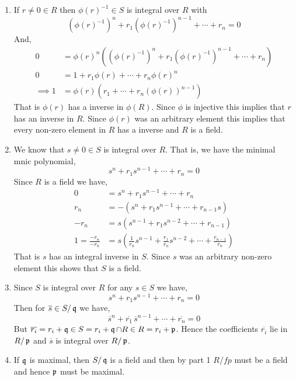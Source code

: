 \documentclass[Notebook.tex]{subfiles}
\begin{document}
\begin{solution}
    \bbni
    \begin{enumerate}
        \item If $r \neq 0 \in R$ then $\phi(r)^{-1} \in S$ is integral over $R$ with 
        \[(\phi(r)^{-1})^n + r_1(\phi(r)^{-1})^{n-1} + \cdots + r_n = 0\]
        And, 
        \begin{align*}
           0 &= \phi(r)^n\left((\phi(r)^{-1})^n + r_1(\phi(r)^{-1})^{n-1} + \cdots + r_n\right) \\
           0 &= 1 + r_1\phi(r) + \cdots + r_n\phi(r)^n  \\
           \implies 1 &= \phi(r)(r_1 + \cdots + r_n(\phi(r))^{n-1})
        \end{align*}
        That is $\phi(r)$ has a inverse in $\phi(R)$. Since $\phi$ is injective this implies that $r$ has an inverse in $R$. Since $\phi(r)$ was an arbitrary element this implies that every non-zero element in $R$ has a inverse and $R$ is a field. 

        \item We know that $s \neq 0 \in S$ is integral over $R$. That is, we have the minimal mnic polynomial, 
        \[s^n + r_1s^{n-1} + \cdots + r_n = 0\]
        Since $R$ is a field we have, 
        \begin{align*}
            0 &= s^n + r_1s^{n-1} + \cdots + r_n  \\ 
            r_n &= - (s^n + r_1s^{n-1} + \cdots + r_{n-1}s) \\ 
            -r_n &= s(s^{n-1} + r_1s^{n-2} + \cdots + r_{n-1}) \\ 
            1 = \frac{-r_n}{-r_n} &= s \left (\frac{1}{r_n}s^{n-1} + \frac{r_1}{r_n}s^{n-2} + \cdots + \frac{r_{n-1}}{r_n} \right )  
        \end{align*}
        That is $s$ has an integral inverse in $S$. Since $s$ was an arbitrary non-zero element this shows that $S$ is a field. 
        

        \item Since $S$ is integral over $R$ for any $s\in S$ we have, 
        \[s^n + r_1s^{n-1} + \cdots + r_n = 0\]
        Then for $\overline{s} \in S/\operatorname{\mathfrak{q}}$ we have, 
        \[\overline{s}^n + \overline{r_1}\,\overline{s}^{n-1} + \cdots + \overline{r_n} = 0\]
        But $\overline{r_i} = r_i + \operatorname{\mathfrak{q}}  \in S = r_i + \operatorname{\mathfrak{q}} \cap R \in R = r_i + \operatorname{\mathfrak{p}}$. 
        Hence the coefficients $\overline{r_i}$ lie in $R/\operatorname{\mathfrak{p}}$ and $\overline{s}$ is integral over $R/\operatorname{\mathfrak{p}}$. 

        \item If $\operatorname{\mathfrak{q}}$ is maximal, then $S/\operatorname{\mathfrak{q}}$ is a field and then by part 1 $R/fp$ must be a field and hence $\operatorname{\mathfrak{p}}$ must be maximal. 
        

\end{enumerate}
\end{solution}
\end{document}
